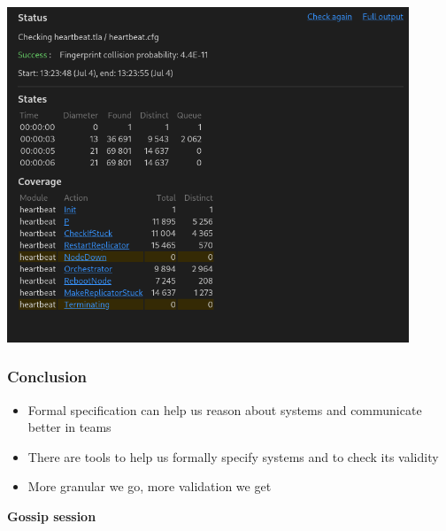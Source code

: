 \documentclass{beamer}
\begin{document}
\begin{frame}
    \includegraphics[width=0.9\textwidth, height=0.9\textheight]{examples/img2.png}
\end{frame}


\begin{frame}
    \frametitle{Conclusion}
    \begin{itemize}
        \item Formal specification can help us reason about systems and communicate better in teams
        \item There are tools to help us formally specify systems and to check its validity 
        \item More granular we go, more validation we get
    \end{itemize}
\end{frame}

\begin{frame}
    \begin{center}
        \LARGE{\textbf{Gossip session}}
    \end{center}

\end{frame}
\end{document}
